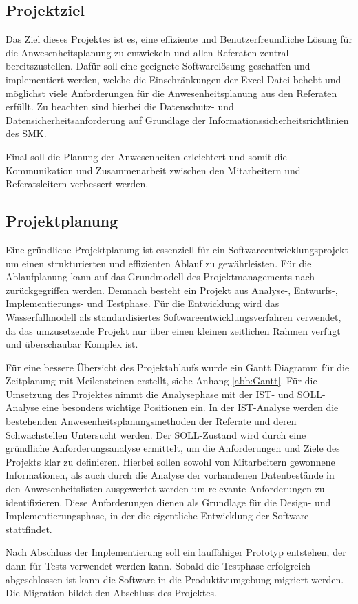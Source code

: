 \subsection{Projektziel}
\label{sec:Projektziel}

Das Ziel dieses Projektes ist es, eine effiziente und Benutzerfreundliche Lösung für die Anwesenheitsplanung zu entwickeln und allen Referaten zentral bereitszustellen. Dafür soll eine geeignete Softwarelösung geschaffen und implementiert werden, welche die Einschränkungen der Excel-Datei behebt und möglichst viele Anforderungen für die Anwesenheitsplanung aus den Referaten erfüllt. Zu beachten sind hierbei die Datenschutz- und Datensicherheitsanforderung auf Grundlage der Informationssicherheitsrichtlinien des SMK.

Final soll die Planung der Anwesenheiten erleichtert und somit die Kommunikation und Zusammenarbeit zwischen den Mitarbeitern und Referatsleitern verbessert werden.

\subsection{Projektplanung}
\label{sec:Projektplanung}

Eine gründliche Projektplanung ist essenziell für ein Softwareentwicklungsprojekt um einen strukturierten und effizienten Ablauf zu gewährleisten. Für die Ablaufplanung kann auf das Grundmodell des Projektmanagements nach \cite[S.225]{dehler-2013} zurückgegriffen werden. Demnach besteht ein Projekt aus Analyse-, Entwurfs-, Implementierungs- und Testphase. Für die Entwicklung wird das Wasserfallmodell als standardisiertes Softwareentwicklungsverfahren verwendet, da das umzusetzende Projekt nur über einen kleinen zeitlichen Rahmen verfügt und überschaubar Komplex ist.

Für eine bessere Übersicht des Projektablaufs wurde ein Gantt Diagramm für die Zeitplanung mit Meilensteinen erstellt, siehe Anhang \ref{abb:Gantt}. Für die Umsetzung des Projektes nimmt die Analysephase mit der IST- und SOLL-Analyse eine besonders wichtige Positionen ein. In der IST-Analyse werden die bestehenden Anwesenheitsplanungsmethoden der Referate und deren Schwachstellen Untersucht werden. Der SOLL-Zustand wird durch eine gründliche Anforderungsanalyse ermittelt, um die Anforderungen und Ziele des Projekts klar zu definieren. Hierbei sollen sowohl von Mitarbeitern gewonnene Informationen, als auch durch die Analyse der vorhandenen Datenbestände in den Anwesenheitslisten ausgewertet werden um relevante Anforderungen zu identifizieren. Diese Anforderungen dienen als Grundlage für die Design- und Implementierungsphase, in der die eigentliche Entwicklung der Software stattfindet.

Nach Abschluss der Implementierung soll ein lauffähiger Prototyp entstehen, der dann für Tests verwendet werden kann. Sobald die Testphase erfolgreich abgeschlossen ist kann die Software in die Produktivumgebung migriert werden. Die Migration bildet den Abschluss des Projektes.


